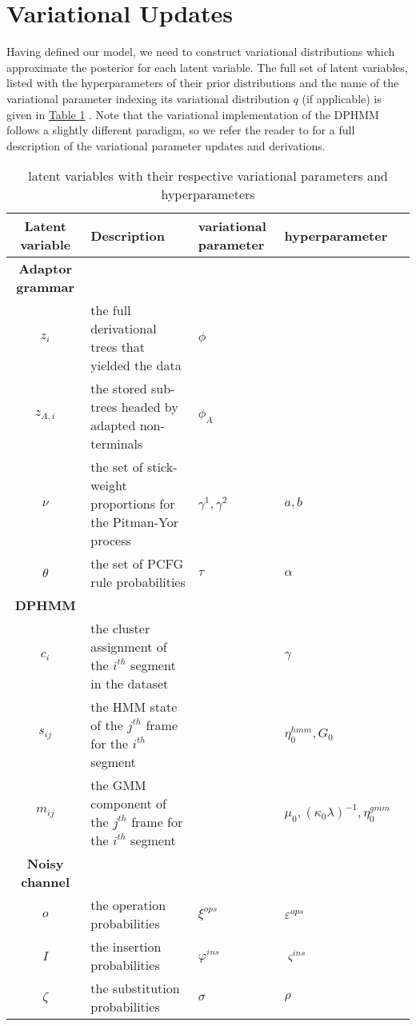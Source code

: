 \documentclass[12pt,letterpaper]{article}
\begin{document}
\section{Variational Updates}
Having defined our model, we need to construct variational distributions which approximate the posterior for each latent variable. The full set of latent variables, listed with the hyperparameters of their prior distributions and the name of the variational parameter indexing its variational distribution $q$ (if applicable) is given in \hyperref[latent]{Table \ref*{latent}} . Note that the variational implementation of the DPHMM follows a slightly different paradigm, so we refer the reader to \citet{ondel:2016} for a full description of the variational parameter updates and derivations. 

\begin{table}
\begin{tabularx}{\textwidth}{|c|X|X|X|X|}
\hline
Latent variable & Description & variational parameter & hyperparameter \\
\hline \hline
\textbf{Adaptor grammar} \\
\hline \hline
$z_i$ & the full derivational trees that yielded the data &  $\phi $ & \\
\hline 
$z_{A,i}$ & the stored sub-trees headed by adapted non-terminals &  $\phi_A$ & \\
\hline
$\nu$& the set of stick-weight proportions for the Pitman-Yor process& $\gamma^1, \gamma^2$ &$a,b$ \\
\hline
$\theta$&  the set of PCFG rule probabilities & $\tau$ & $\alpha$ \\
\hline
\textbf{DPHMM} \\
\hline \hline 
$c_i$ & the cluster assignment of the $i^{th}$ segment in the dataset & &  $\gamma$ \\ 
\hline
$s_{ij}$ & the HMM state of the $j^{th}$ frame for the $i^{th}$ segment & &  $\eta_0^{hmm}, G_0$ \\
\hline
$m_{ij}$ & the GMM component of the $j^{th}$ frame for the $i^{th}$ segment & &   $\mu_0, (\kappa_0\lambda)^{-1}, \eta_0^{gmm}$ \\
\hline
\textbf{Noisy channel}\\
\hline \hline
$o$& the operation probabilities&  $\xi^{ops}$ &  $\varepsilon^{ops}$ \\
\hline
$I$& the insertion probabilities& $\varphi^{ins}$&  $\varsigma^{ins}$\\
\hline 
$\zeta$& the substitution probabilities& $\sigma$  & $\rho $\\
\hline
\end{tabularx}
\caption{latent variables with their respective variational parameters and hyperparameters}
\label{latent}
\end{table}
\end{document}
